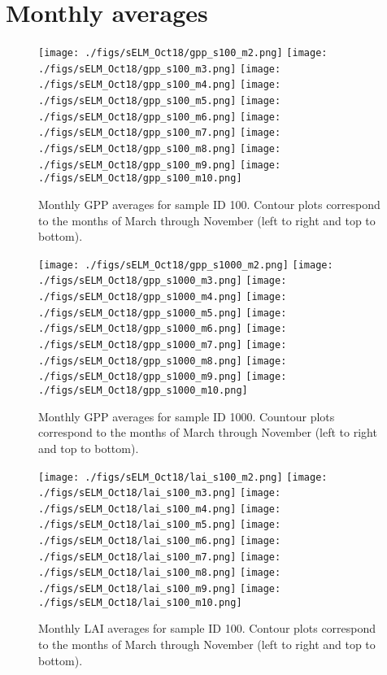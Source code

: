 \documentclass[10pt]{article}
\begin{document}
\section{Monthly averages}

\begin{figure}[htb!]
\centering
\texttt{[image: ./figs/sELM\_Oct18/gpp\_s100\_m2.png]}
\texttt{[image: ./figs/sELM\_Oct18/gpp\_s100\_m3.png]}
\texttt{[image: ./figs/sELM\_Oct18/gpp\_s100\_m4.png]}
\texttt{[image: ./figs/sELM\_Oct18/gpp\_s100\_m5.png]}
\texttt{[image: ./figs/sELM\_Oct18/gpp\_s100\_m6.png]}
\texttt{[image: ./figs/sELM\_Oct18/gpp\_s100\_m7.png]}
\texttt{[image: ./figs/sELM\_Oct18/gpp\_s100\_m8.png]}
\texttt{[image: ./figs/sELM\_Oct18/gpp\_s100\_m9.png]}
\texttt{[image: ./figs/sELM\_Oct18/gpp\_s100\_m10.png]}
\caption{Monthly GPP averages for sample ID 100. Contour plots correspond to the months of March through November (left to right and top to bottom).\label{fig:gppavg100}}
\end{figure}

\begin{figure}[htb!]
\centering
\texttt{[image: ./figs/sELM\_Oct18/gpp\_s1000\_m2.png]}
\texttt{[image: ./figs/sELM\_Oct18/gpp\_s1000\_m3.png]}
\texttt{[image: ./figs/sELM\_Oct18/gpp\_s1000\_m4.png]}
\texttt{[image: ./figs/sELM\_Oct18/gpp\_s1000\_m5.png]}
\texttt{[image: ./figs/sELM\_Oct18/gpp\_s1000\_m6.png]}
\texttt{[image: ./figs/sELM\_Oct18/gpp\_s1000\_m7.png]}
\texttt{[image: ./figs/sELM\_Oct18/gpp\_s1000\_m8.png]}
\texttt{[image: ./figs/sELM\_Oct18/gpp\_s1000\_m9.png]}
\texttt{[image: ./figs/sELM\_Oct18/gpp\_s1000\_m10.png]}
\caption{Monthly GPP averages for sample ID 1000. Countour plots correspond to the months of March through November (left to right and top to bottom).\label{fig:gppavg1000}}
\end{figure}

\begin{figure}[htb!]
\centering
\texttt{[image: ./figs/sELM\_Oct18/lai\_s100\_m2.png]}
\texttt{[image: ./figs/sELM\_Oct18/lai\_s100\_m3.png]}
\texttt{[image: ./figs/sELM\_Oct18/lai\_s100\_m4.png]}
\texttt{[image: ./figs/sELM\_Oct18/lai\_s100\_m5.png]}
\texttt{[image: ./figs/sELM\_Oct18/lai\_s100\_m6.png]}
\texttt{[image: ./figs/sELM\_Oct18/lai\_s100\_m7.png]}
\texttt{[image: ./figs/sELM\_Oct18/lai\_s100\_m8.png]}
\texttt{[image: ./figs/sELM\_Oct18/lai\_s100\_m9.png]}
\texttt{[image: ./figs/sELM\_Oct18/lai\_s100\_m10.png]}
\caption{Monthly LAI averages for sample ID 100. Contour plots correspond to the months of March through November (left to right and top to bottom).\label{fig:laiavg100}}
\end{figure}
\end{document}
